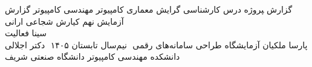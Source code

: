 ‫
‫%
‫%
‫%
‫
‫\newcommand{\ProjectReportType}
‫{ گزارش ‍‍‍‍‍پروژه درس} 
‫\newcommand{\StudentDegree}
‫{کارشناسی گرایش معماری کامپیوتر}  %
‫\newcommand{\CourseMajor}
‫{مهندسی کامپیوتر}  %
‫\newcommand{\CourseReportTitle}
‫{گزارش آزمایش نهم}
‫\newcommand{\GroupeMembers}
‫{کیارش شجاعی ارانی \\ سینا فعالیت \\ پارسا ملکیان}
‫\newcommand{\CourseName}
‫{آزمایشگاه طراحی سامانه‌های رقمی}
‫
‫\newcommand{\courseSemester}
‫{نیم‌سال تابستان ۱۴۰۵}
‫
‫\newcommand{\CourseProfessor}
‫{دکتر اجلالی}
‫\newcommand{\Department}
‫{دانشکده مهندسی کامپیوتر}
‫\newcommand{\University}
‫{دانشگاه صنعتی شریف}
‫
‫%
‫%
‫%
‫
‫